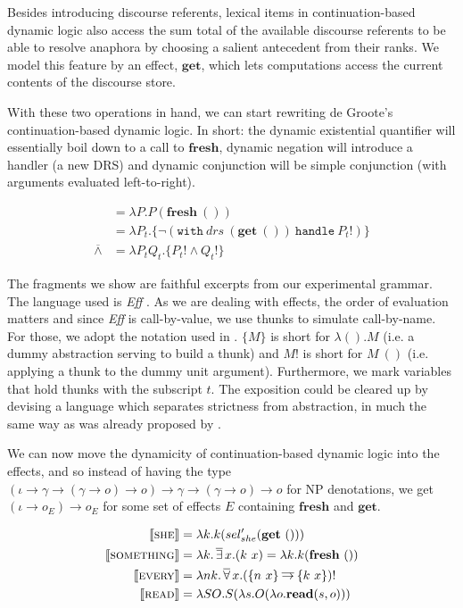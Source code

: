 \documentclass{article}
\newcommand{\dand}{\mathbin{\overline{\land}}}
\newcommand{\dnot}{\mathop{\overline{\lnot}}}
\newcommand{\dimpl}{\mathbin{\overline{\to}}}
\newcommand{\dexists}{\mathop{\overline{\exists}}}
\newcommand{\dforall}{\mathop{\overline{\forall}}}
\newcommand{\sem}[1]{\llbracket #1 \rrbracket}
\newcommand{\keyword}[1]{\texttt{#1}}
\newcommand{\effect}[1]{\textbf{#1}}
\newcommand{\semdom}[1]{\textbf{#1}}
\newcommand{\handle}[2]{\keyword{with}\ #1\ \keyword{handle}\ #2}
\begin{document}
Besides introducing discourse referents, lexical items in continuation-based
dynamic logic also access the sum total of the available discourse referents
to be able to resolve anaphora by choosing a salient antecedent from their
ranks. We model this feature by an effect, $\effect{get}$, which lets
computations access the current contents of the discourse store.

With these two operations in hand, we can start rewriting de Groote's
continuation-based dynamic logic. In short: the dynamic existential quantifier
will essentially boil down to a call to $\effect{fresh}$, dynamic negation
will introduce a handler (a new DRS) and dynamic conjunction will be simple
conjunction (with arguments evaluated left-to-right).

\vspace{-4mm}

\begin{align*}
  \dexists &= \lambda P. P (\effect{fresh}\ ()) \\
  \dnot &= \lambda P_t. \{ \lnot (\handle{drs\ (\effect{get}\ ())}{P_t!}) \} \\
  \dand &= \lambda P_t Q_t. \{ P_t! \land Q_t! \}
\end{align*}

The fragments we show are faithful excerpts from our experimental grammar. The
language used is \emph{Eff} \citep{bauer2012programming}. As we are dealing
with effects, the order of evaluation matters and since \emph{Eff} is
call-by-value, we use thunks to simulate call-by-name. For those, we adopt the
notation used in \citet {kammar2013handlers}. $\{ M \}$ is short for $\lambda
(). M$ (i.e. a dummy abstraction serving to build a thunk) and $M!$ is short
for $M\ ()$ (i.e. applying a thunk to the dummy unit argument). Furthermore,
we mark variables that hold thunks with the subscript $t$. The exposition
could be cleared up by devising a language which separates strictness from
abstraction, in much the same way as was already proposed by
\citet{kiselyov2008call}.

We can now move the dynamicity of continuation-based dynamic logic into the
effects, and so instead of having the type $(\iota \to \gamma \to (\gamma \to
o) \to o) \to \gamma \to (\gamma \to o) \to o$ for NP denotations, we get
$(\iota \to o_E) \to o_E$ for some set of effects $E$ containing
$\effect{fresh}$ and $\effect{get}$.

\vspace{-4mm}

\begin{align*}
  \sem{\textsc{she}} &= \lambda k. k (sel_{she}' (\effect{get}\ ())) \\
  \sem{\textsc{something}} &= \lambda k. \dexists x. (k\ x) = \lambda k. k
  (\effect{fresh}\ ()) \\
  \sem{\textsc{every}} &= \lambda n k. \dforall x. (\{n\ x\} \dimpl \{k\ x\})! \\
  \sem{\textsc{read}} &= \lambda S O. S (\lambda s. O (\lambda
  o. \semdom{read}(s, o)))
\end{align*}
\end{document}
